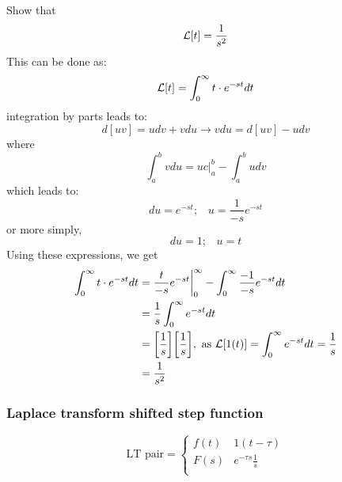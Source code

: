 \documentclass[12pt,letter]{article}
\begin{document}
\begin{mdframed}[middlelinewidth=0.5mm]
\begin{center}
\end{center}
Show that
\begin{equation}
\mathcal{L}{\left[t\right]} = \frac{1}{s^2}
\end{equation}
This can be done as:
\begin{equation}
\mathcal{L}{\left[t\right]} =  \int_{0}^{\infty}t \cdot e^{-st} dt
\end{equation}
integration by parts leads to:
\begin{equation}
d[uv] = udv + vdu \rightarrow vdu = d[uv] - udv
\end{equation}
where
\begin{equation}
 \int_{a}^{b} vdu = uc \bigg|_a^b - \int_{a}^{b} u dv
\end{equation}
which leads to:
\begin{equation}
du = e^{-st};  \; \; \; u = \frac{1}{-s}e^{-st}
\end{equation}
or more simply, 
\begin{equation}
du = 1;  \; \; \; u = t
\end{equation}
Using these expressions, we get
\begin{align}
	 \int_{0}^{\infty}t \cdot e^{-st} dt &=  \frac{t}{-s} e^{-s t} \bigg|_0^\infty - \int_{0}^{\infty}\frac{-1}{-s}e^{-st} dt \\ \nonumber
	&= \frac{1}{s} \int_{0}^{\infty} e^{-st} dt \\ \nonumber
&= \bigg[\frac{1}{s}\bigg]\bigg[\frac{1}{s}\bigg],\text{ as }  \mathcal{L}{\left[1(t)\right]} =  \int_{0}^{\infty} e^{-st} dt  = \frac{1}{s} \\ \nonumber
&= \frac{1}{s^2}
\end{align}
\end{mdframed}


		\subsubsection{Laplace transform shifted step function}

		\begin{equation}
		\text{LT pair} =
			\begin{cases}
			f(t) & 1(t-\tau) \\
			F(s) & e^{-\tau s} \frac{1}{s} \\
			\end{cases}
		\end{equation}
\end{document}
